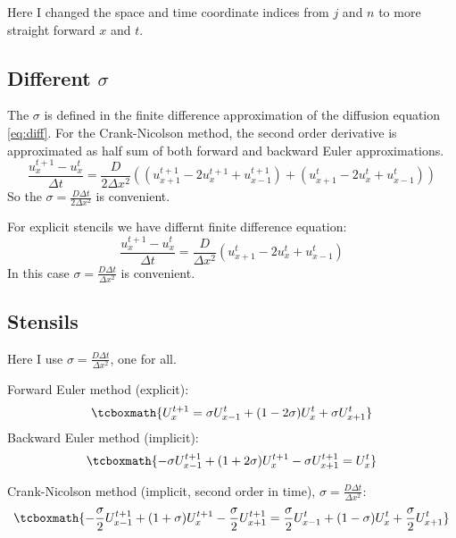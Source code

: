 \documentclass[../summary.tex]{subfiles}
\begin{document}
    
Here I changed the space and time coordinate indices from $j$ and $n$ to more straight forward $x$ and $t$.
\subsection{Different $\sigma$}
The $\sigma$ is defined in the finite difference approximation of the diffusion equation \ref{eq:diff}. For the Crank-Nicolson method, the second order derivative is approximated as half sum of both forward and backward Euler approximations.
\begin{equation}
    \frac{u_{x}^{t + 1} - u_{x}^{t}}{\Delta t} = \frac{D}{2 \Delta x^2}
    \left(
    (u_{x + 1}^{t + 1} - 2 u_{x}^{t + 1} + u_{x - 1}^{t + 1}) + 
    (u_{x + 1}^{t} - 2 u_{x}^{t} + u_{x - 1}^{t})
    \right)
\end{equation}
So the $\sigma=\frac{D\Delta t}{2\Delta x^2}$ is convenient.

For explicit stencils we have differnt finite difference equation:
\begin{equation}
    \frac{u_{x}^{t + 1} - u_{x}^{t}}{\Delta t} = \frac{D}{\Delta x^2}
    \left(u_{x + 1}^{t} - 2 u_{x}^{t} + u_{x - 1}^{t}\right)    
\end{equation}
In this case $\sigma = \frac{D\Delta t}{\Delta x^2}$  is convenient.

\subsection{Stensils}
Here I use $\sigma = \frac{D\Delta t}{\Delta x^2}$, one for all.

Forward Euler method (explicit):
\begin{equation}
    \tcboxmath{
    U_{x}^{t+1} = \sigma U_{x-1}^{t} + (1-2\sigma)U_{x}^{t} + \sigma U_{x+1}^{t}
    }
\end{equation}
Backward Euler method (implicit):
\begin{equation}
    \tcboxmath{
    -\sigma U_{x-1}^{t+1} + (1+2\sigma)U_{x}^{t+1} - \sigma U_{x+1}^{t+1} = U_{x}^{t}
    }
\end{equation}

Crank-Nicolson method (implicit, second order in time), $\sigma = \frac{D\Delta t}{\Delta x^2}$:
\begin{equation}
    \tcboxmath{
    -\frac{\sigma}{2} U_{x-1}^{t+1} + (1+\sigma)U_{x}^{t+1} - \frac{\sigma}{2} U_{x+1}^{t+1} = \frac{\sigma}{2} U_{x-1}^{t} + (1-\sigma)U_{x}^{t} + \frac{\sigma}{2} U_{x+1}^{t}
    }
\end{equation}
\end{document}
